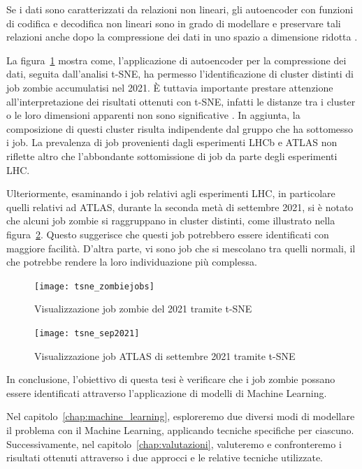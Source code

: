 Se i dati sono caratterizzati da relazioni non lineari, gli autoencoder con
funzioni di codifica e decodifica non lineari sono in grado di modellare e
preservare tali relazioni anche dopo la compressione dei dati in uno spazio a
dimensione ridotta \cite{Goodfellow2016}.

La figura~\ref{fig:tsne_zombiejobs} mostra come, l'applicazione di autoencoder
per la compressione dei dati, seguita dall'analisi t-SNE, ha permesso
l'identificazione di cluster distinti di job zombie accumulatisi nel 2021. È
tuttavia importante prestare attenzione all'interpretazione dei risultati
ottenuti con t-SNE, infatti le distanze tra i cluster o le loro dimensioni
apparenti non sono significative \cite{Wattenberg2016}. In aggiunta, la
composizione di questi cluster risulta indipendente dal gruppo che ha
sottomesso i job. La prevalenza di job provenienti dagli esperimenti LHCb e
ATLAS non riflette altro che l'abbondante sottomissione di job da parte degli
esperimenti LHC.

Ulteriormente, esaminando i job relativi agli esperimenti LHC, in particolare
quelli relativi ad ATLAS, durante la seconda metà di settembre 2021, si è
notato che alcuni job zombie si raggruppano in cluster distinti, come
illustrato nella figura~\ref{fig:tsne_sep2021}. Questo suggerisce che questi
job potrebbero essere identificati con maggiore facilità. D'altra parte, vi
sono job che si mescolano tra quelli normali, il che potrebbe rendere la loro
individuazione più complessa.

\begin{figure}[!hb]
   \centering
   \texttt{[image: tsne\_zombiejobs]}
   \caption{Visualizzazione job zombie del 2021 tramite t-SNE}
   \label{fig:tsne_zombiejobs}
\end{figure}

\begin{figure}[!hb]
   \centering
   \texttt{[image: tsne\_sep2021]}
   \caption{Visualizzazione job ATLAS di settembre 2021 tramite t-SNE}
   \label{fig:tsne_sep2021}
\end{figure}

In conclusione, l'obiettivo di questa tesi è verificare che i job zombie
possano essere identificati attraverso l'applicazione di modelli di Machine
Learning.

Nel capitolo~\ref{chap:machine_learning}, esploreremo due diversi modi di
modellare il problema con il Machine Learning, applicando tecniche specifiche
per ciascuno. Successivamente, nel capitolo~\ref{chap:valutazioni}, valuteremo
e confronteremo i risultati ottenuti attraverso i due approcci e le relative
tecniche utilizzate.

